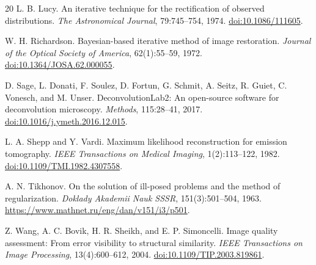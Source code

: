\begin{thebibliography}{20}
L. B. Lucy.
An iterative technique for the rectification of observed distributions.
\emph{The Astronomical Journal}, 79:745--754, 1974.
\href{https://doi.org/10.1086/111605}{doi:10.1086/111605}.

W. H. Richardson.
Bayesian-based iterative method of image restoration.
\emph{Journal of the Optical Society of America}, 62(1):55--59, 1972.
\href{https://doi.org/10.1364/JOSA.62.000055}{doi:10.1364/JOSA.62.000055}.

D. Sage, L. Donati, F. Soulez, D. Fortun, G. Schmit, A. Seitz, R. Guiet, C. Vonesch, and M. Unser.
DeconvolutionLab2: An open-source software for deconvolution microscopy.
\emph{Methods}, 115:28--41, 2017.
\href{https://doi.org/10.1016/j.ymeth.2016.12.015}{doi:10.1016/j.ymeth.2016.12.015}.

L. A. Shepp and Y. Vardi.
Maximum likelihood reconstruction for emission tomography.
\emph{IEEE Transactions on Medical Imaging}, 1(2):113--122, 1982.
\href{https://doi.org/10.1109/TMI.1982.4307558}{doi:10.1109/TMI.1982.4307558}.

A. N. Tikhonov.
On the solution of ill-posed problems and the method of regularization.
\emph{Doklady Akademii Nauk SSSR}, 151(3):501--504, 1963.
\url{https://www.mathnet.ru/eng/dan/v151/i3/p501}.

Z. Wang, A. C. Bovik, H. R. Sheikh, and E. P. Simoncelli.
Image quality assessment: From error visibility to structural similarity.
\emph{IEEE Transactions on Image Processing}, 13(4):600--612, 2004.
\href{https://doi.org/10.1109/TIP.2003.819861}{doi:10.1109/TIP.2003.819861}.
\end{thebibliography}
